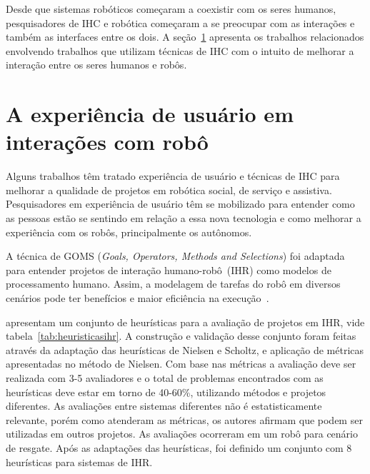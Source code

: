 Desde que sistemas robóticos começaram a coexistir com os seres humanos, pesquisadores de IHC e robótica começaram a se preocupar com as interações e também as interfaces entre os dois. A seção~\ref{sec:ihrux} apresenta os trabalhos relacionados envolvendo trabalhos que utilizam técnicas de IHC com o intuito de melhorar a interação entre os seres humanos e robôs.

\section{A experiência de usuário em interações com robô}
\label{sec:ihrux}
Alguns trabalhos têm tratado experiência de usuário e técnicas de IHC para melhorar a qualidade de projetos em robótica social, de serviço e assistiva. Pesquisadores em experiência de usuário têm se mobilizado para entender como as pessoas estão se sentindo em relação a essa nova tecnologia e como melhorar a experiência com os robôs, principalmente os autônomos.

A técnica de GOMS (\emph{Goals, Operators, Methods and Selections}) foi adaptada para entender projetos de interação humano-robô~(IHR) como modelos de processamento humano. Assim, a modelagem de tarefas do robô em diversos cenários pode ter benefícios e maior eficiência na execução~\cite{drury:2007}.

\textcite{clarkson:2007} apresentam um conjunto de heurísticas para a avaliação de projetos em IHR, vide tabela~\ref{tab:heuristicasihr}. A construção e validação desse conjunto foram feitas através da adaptação das heurísticas de Nielsen e Scholtz, e aplicação de métricas apresentadas no método de Nielsen. Com base nas métricas a avaliação deve ser realizada com 3-5 avaliadores e o total de problemas encontrados com as heurísticas deve estar em torno de 40-60\%, utilizando métodos e projetos diferentes. As avaliações entre sistemas diferentes não é estatisticamente relevante, porém como atenderam as métricas, os autores afirmam que podem ser utilizadas em outros projetos. As avaliações ocorreram em um robô para cenário de resgate. Após as adaptações das heurísticas, foi definido um conjunto com 8 heurísticas para sistemas de IHR.


